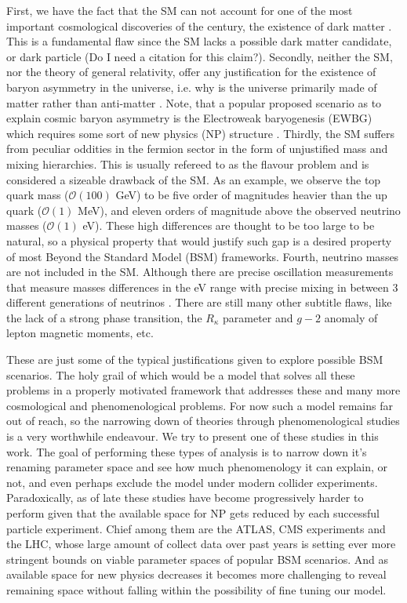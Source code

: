 First, we have the fact that the SM can not account for one of the most important cosmological discoveries of the century, the existence of dark matter \cite{Bergstr_m_2000}. 
%
This is a fundamental flaw since the SM lacks a possible dark matter candidate, or dark particle {\color{red} (Do I need a citation for this claim?).} 
%
Secondly, neither the SM,  nor the theory of general relativity, offer any justification for the existence of baryon asymmetry in the universe, i.e. why is the universe primarily made of matter rather than anti-matter \cite{book_Baryion}. 
%
Note, that a popular proposed scenario as to explain cosmic baryon asymmetry is the Electroweak baryogenesis (EWBG) which requires some sort of new physics (NP) structure \cite{Morrissey2012}. 
%
Thirdly, the SM suffers from peculiar oddities in the fermion sector in the form of unjustified mass and mixing hierarchies. This is usually refereed to as the flavour problem and is considered a sizeable drawback of the SM. 
%
As an example, we observe the top quark mass ($\mathcal{O}(100)$ GeV) to be five order of magnitudes heavier than the up quark ($\mathcal{O}(1)$ MeV), and eleven orders of magnitude above the observed neutrino masses ($\mathcal{O}(1)$ eV). 
%
These high differences are thought to be too large to be natural, so a physical property that would justify such gap is a desired property of most Beyond the Standard Model (BSM) frameworks. 
%
Fourth, neutrino masses are not included in the SM. Although there are precise oscillation measurements that measure masses differences in the eV range with precise mixing in between 3 different generations of neutrinos \cite{PhysRevD.89.013001}. 
%
There are still many other subtitle flaws, like the lack of a strong phase transition, the $R_{\kappa}$ parameter and $g-2$ anomaly of lepton magnetic moments, etc. 

These are just some of the typical justifications given to explore possible BSM scenarios. The holy grail of which would be a model that solves all these problems in a properly motivated framework that addresses these and many more cosmological and phenomenological problems.  
% 
For now such a model remains far out of reach, so the narrowing down of theories through phenomenological studies is a very worthwhile endeavour. We try to present one of these studies in this work. %
%
The goal of performing these types of analysis is to narrow down it's renaming parameter space and see how much phenomenology it can explain, or not, and even perhaps exclude the model under modern collider experiments.
%
Paradoxically, as of late these studies have become progressively harder to perform given that the available space for NP gets reduced by each successful particle experiment. 
%
Chief among them are the ATLAS, CMS experiments and the LHC, whose large amount of collect data over past years is setting ever more stringent bounds on viable parameter spaces of popular BSM scenarios. 
%
And as available space for new physics decreases it becomes more challenging to reveal remaining space without falling within the possibility of fine tuning our model.  

